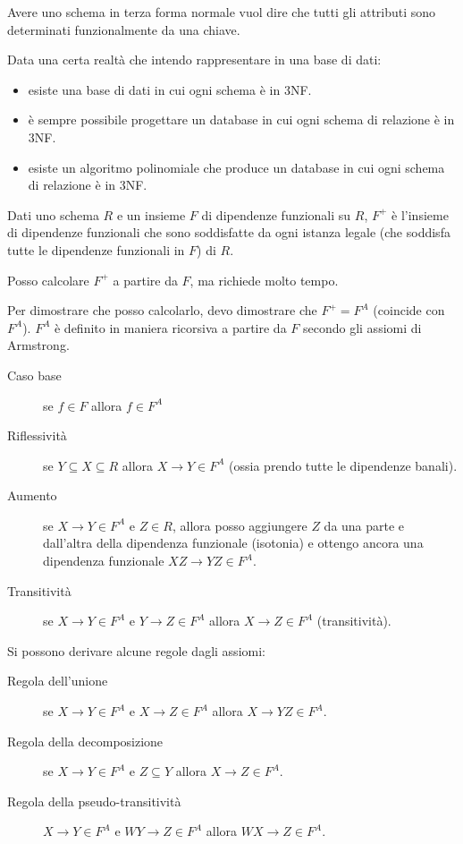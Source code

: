 Avere uno schema in terza forma normale vuol dire che tutti gli attributi sono determinati funzionalmente da una chiave.

Data una certa realt\`a che intendo rappresentare in una base di dati: 
\begin{itemize}
    \item esiste una base di dati in cui ogni schema \`e in 3NF.
    \item \`e sempre possibile progettare un database in cui ogni schema di relazione \`e in 3NF.
    \item esiste un algoritmo polinomiale che produce un database in cui ogni schema di relazione \`e in 3NF.
\end{itemize}

Dati uno schema $R$ e un insieme $F$ di dipendenze funzionali su $R$, $F^+ $ \`e l'insieme di dipendenze funzionali che sono soddisfatte da ogni istanza legale (che soddisfa tutte le dipendenze funzionali in $F$) di $R$.

Posso calcolare $F^+$ a partire da $F$, ma richiede molto tempo. 

Per dimostrare che posso calcolarlo, devo dimostrare che $F^+ = F^A$ (coincide con $F^A$). $F^A$ \`e definito in maniera ricorsiva a partire da $F$ secondo gli assiomi di Armstrong.
\begin{defn}
\begin{description}
    \item[Caso base] se $f \in F$ allora $f \in F^A$
    \item[Riflessivit\`a\label{itm:armstrong_riflessivita}] se $Y \subseteq X \subseteq R$ allora $X \to Y \in F^A$ (ossia prendo tutte le dipendenze banali).
    \item[Aumento\label{itm:armstrong_aumento}] se $X \to Y \in F^A$ e $Z \in R$, allora posso aggiungere $Z$ da una parte e dall'altra della dipendenza funzionale (isotonia) e ottengo ancora una dipendenza funzionale $XZ \to YZ \in F^A$.
    \item[Transitivit\`a\label{itm:armstrong_transitivita}] se $X \to Y \in F^A$ e $Y \to Z \in F^A$ allora $X \to Z \in F^A$ (transitivit\`a).
\end{description}
\end{defn}

Si possono derivare alcune regole dagli assiomi:

\begin{description}
    \item[Regola dell'unione\label{itm:regola_unione}] se $X \to Y \in F^A$ e $X \to Z \in F^A$ allora $X \to YZ \in F^A$.
    \item[Regola della decomposizione\label{itm:regola_decomposizione}] se $X \to Y \in F^A$ e $Z \subseteq Y$ allora $X \to Z \in F^A$.
    \item[Regola della pseudo-transitivit\`a\label{itm:regola_pseudo_transitivita}] $X \to Y \in F^A$ e $WY \to Z \in F^A$ allora $WX \to Z \in F^A$.
\end{description}

